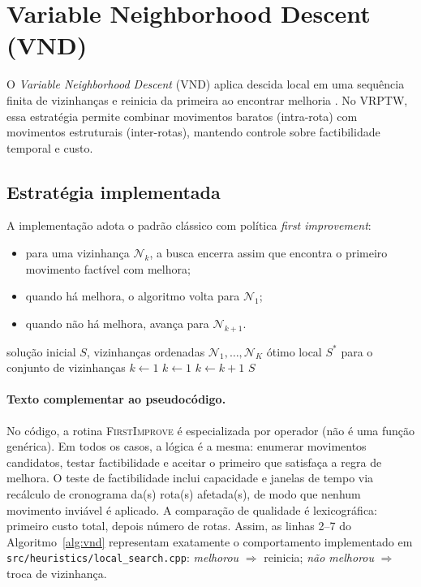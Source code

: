 \section{Variable Neighborhood Descent (VND)}
\label{sec:vnd}

O \emph{Variable Neighborhood Descent} (VND) aplica descida local em uma sequência finita de vizinhanças e reinicia da primeira ao encontrar melhoria \cite{hansen2001variable}. No VRPTW, essa estratégia permite combinar movimentos baratos (intra-rota) com movimentos estruturais (inter-rotas), mantendo controle sobre factibilidade temporal e custo.

\subsection{Estratégia implementada}

A implementação adota o padrão clássico com política \emph{first improvement}:
\begin{itemize}
  \item para uma vizinhança $\mathcal{N}_k$, a busca encerra assim que encontra o primeiro movimento factível com melhora;
  \item quando há melhora, o algoritmo volta para $\mathcal{N}_1$;
  \item quando não há melhora, avança para $\mathcal{N}_{k+1}$.
\end{itemize}

\begin{algorithm}[htbp]
\caption{VND com \emph{first improvement}}
\label{alg:vnd}
\begin{algorithmic}[1]
\Require solução inicial $S$, vizinhanças ordenadas $\mathcal{N}_1,\ldots,\mathcal{N}_K$
\Ensure ótimo local $S^*$ para o conjunto de vizinhanças
\State $k \leftarrow 1$
    \State $k \leftarrow 1$
  \Else
    \State $k \leftarrow k + 1$
  \EndIf
\EndWhile
\State \Return $S$
\end{algorithmic}
\end{algorithm}

\paragraph{Texto complementar ao pseudocódigo.}
No código, a rotina \textsc{FirstImprove} é especializada por operador (não é uma função genérica). Em todos os casos, a lógica é a mesma: enumerar movimentos candidatos, testar factibilidade e aceitar o primeiro que satisfaça a regra de melhora. O teste de factibilidade inclui capacidade e janelas de tempo via recálculo de cronograma da(s) rota(s) afetada(s), de modo que nenhum movimento inviável é aplicado. A comparação de qualidade é lexicográfica: primeiro custo total, depois número de rotas. Assim, as linhas 2--7 do Algoritmo~\ref{alg:vnd} representam exatamente o comportamento implementado em \texttt{src/heuristics/local\_search.cpp}: \emph{melhorou} $\Rightarrow$ reinicia; \emph{não melhorou} $\Rightarrow$ troca de vizinhança.

